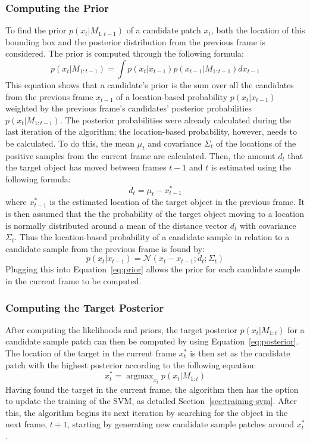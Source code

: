 \documentclass{sig-alternate-05-2015}
\DeclareMathOperator*{\argmax}{argmax} %
\begin{document}
\subsubsection{Computing the Prior}
To find the prior $p(x_t|M_{1:t-1})$ of a candidate patch $x_t$, both the location of this bounding box and the posterior distribution from the previous frame is considered.
The prior is computed through the following formula:
\begin{equation}
\label{eq:prior}
p(x_t|M_{1:t-1}) = \int p(x_t|x_{t-1}) p(x_{t-1}|M_{1:t-1}) dx_{t-1}
\end{equation}
This equation shows that a candidate's prior is the sum over all the candidates from the previous frame $x_{t-1}$ of a location-based probability $p(x_t|x_{t-1})$ weighted by the previous frame's candidates' posterior probabilities $p(x_t|M_{1:t-1})$.
The posterior probabilities were already calculated during the last iteration of the algorithm; the location-based probability, however, needs to be calculated.
To do this, the mean $\mu_t$ and covariance $\Sigma_t$ of the locations of the positive samples from the current frame are calculated.
Then, the amount $d_t$ that the target object has moved between frames $t-1$ and $t$ is estimated using the following formula:
\begin{equation}
d_t = \mu_t - x^*_{t-1}
\end{equation}
where $x^*_{t-1}$ is the estimated location of the target object in the previous frame.
It is then assumed that the the probability of the target object moving to a location is normally distributed around a mean of the distance vector $d_t$ with covariance $\Sigma_t$.
Thus the location-based probability of a candidate sample in relation to a candidate sample from the previous frame is found by:
\begin{equation}
p(x_t|x_{t-1}) = \mathcal{N}(x_t-x_{t-1}; d_t ; \Sigma_t)
\end{equation}
Plugging this into Equation~\ref{eq:prior} allows the prior for each candidate sample in the current frame to be computed.

\subsubsection{Computing the Target Posterior}
After computing the likelihoods and priors, the target posterior $p(x_t|M_{1:t})$ for a candidate sample patch can then be computed by using Equation~\ref{eq:posterior}.
The location of the target in the current frame $x_t^*$ is then set as the candidate patch with the highest posterior according to the following equation:
\begin{equation}
x_t^* = \argmax_{x_t} p(x_t|M_{1:t})
\end{equation}
Having found the target in the current frame, the algorithm then has the option to update the training of the SVM, as detailed Section~\ref{sec:training-svm}.
After this, the algorithm begins its next iteration by searching for the object in the next frame, $t+1$, starting by generating new candidate sample patches around $x_t^*$.
\end{document}
